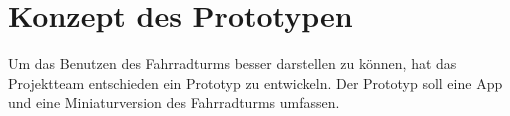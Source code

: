 \section{Konzept des Prototypen}

Um das Benutzen des Fahrradturms besser darstellen zu können, hat das Projektteam entschieden ein Prototyp zu entwickeln. Der Prototyp soll eine App und eine Miniaturversion des Fahrradturms umfassen.



\clearpage


\clearpage
